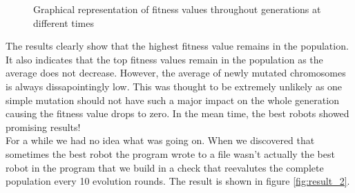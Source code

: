 \documentclass[a4paper,10pt]{article}
\begin{document}
\begin{figure}[h!]
  \centering
  \caption{Graphical representation of fitness values throughout generations at different times}
  \label{fig:result_1}
\end{figure}

The results clearly show that the highest fitness value remains in the population. It also indicates that the top fitness values remain in the population as the average does not decrease. However, the average of newly mutated chromosomes is always dissapointingly low. This was thought to be extremely unlikely as one simple mutation should not have such a major impact on the whole generation causing the fitness value drops to zero. In the mean time, the best robots showed promising results!\\

For a while we had no idea what was going on. When we discovered that sometimes the best robot the program wrote to a file wasn't actually the best robot in the program that we build in a check that reevalutes the complete population every 10 evolution rounds. The result is shown in figure \ref{fig:result_2}.
\end{document}
